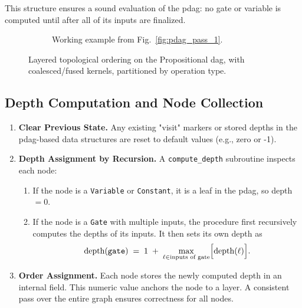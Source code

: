 This structure ensures a sound evaluation of the \acrshort{pdag}: no gate or variable is computed until after all of its inputs are finalized.

\begin{figure}
    \centering
    \begin{subfigure}{1\textwidth}
        \centering
        
    \caption{Working example from Fig.~\ref{fig:pdag_pass_1}.}
        \label{fig:recall_pdag_pass_1}
    \end{subfigure}
    \vfill
    \begin{subfigure}{1\textwidth}
        \centering
        
        \label{fig:pdag_pass_2}
    \end{subfigure}
    \caption{Layered topological ordering on the Propositional \acrfull{dag}, with coalesced/fused kernels, partitioned by operation type.}
\end{figure}

\subsection{Depth Computation and Node Collection}

\begin{enumerate}
    \item \textbf{Clear Previous State.}  
      Any existing "visit" markers or stored depths in the \acrshort{pdag}-based data structures are reset to default values (e.g., zero or -1).
      
    \item \textbf{Depth Assignment by Recursion.}  
      A \texttt{compute\_depth} subroutine inspects each node:
      \begin{enumerate}
        \item If the node is a \texttt{Variable} or \texttt{Constant}, it is a leaf in the \acrshort{pdag}, so depth \(=0\).  
        \item If the node is a \texttt{Gate} with multiple inputs, the procedure first recursively computes the depths of its inputs. It then sets its own depth as 
        \[
          \text{depth}(\texttt{gate})
          \;=\;
          1 \;+\;\max\limits_{\ell \in \text{inputs of gate}} \Bigl[\text{depth}(\ell)\Bigr].
        \]
      \end{enumerate}
    \item \textbf{Order Assignment.}  
      Each node stores the newly computed depth in an internal field. This numeric value anchors the node to a layer. A consistent pass over the entire graph ensures correctness for all nodes.
\end{enumerate}

